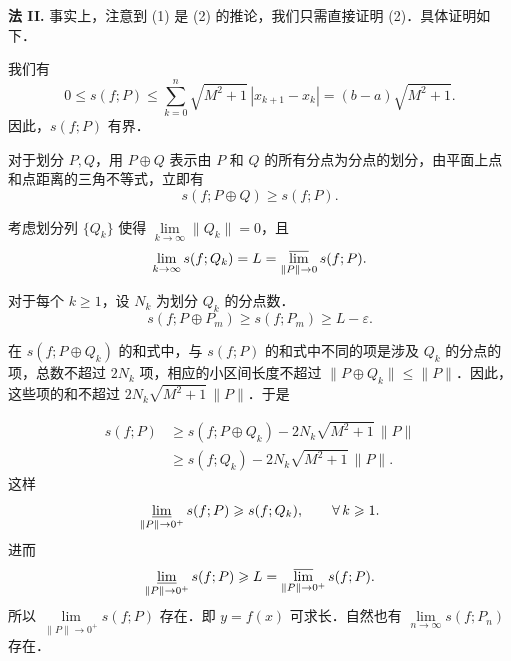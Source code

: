 \begin{solution}
\textbf{法 II.} 事实上，注意到 (1) 是 (2) 的推论，我们只需直接证明 (2)．具体证明如下．

我们有
\[
  0\leqslant s(f;P)\leqslant\sum_{k=0}^{n}\sqrt{M^2+1}\,|x_{k+1}-x_k|=(b-a)\sqrt{M^2+1}.
\]
因此，$s(f;P)$ 有界．

对于划分 $P,Q$，用 $P\oplus Q$ 表示由 $P$ 和 $Q$ 的所有分点为分点的划分，由平面上点和点距离的三角不等式，立即有
\[
  s(f;P\oplus Q)\geqslant s(f;P).
\]

考虑划分列 $\{Q_k\}$ 使得 $\lim\limits_{k\to\infty}\|Q_k\|=0$，且
\[
  \lim_{k\to\infty}s(f;Q_k)=L=\varlimsup_{\|P\|\to 0}s(f;P).
\]

对于每个 $k\geqslant 1$，设 $N_k$ 为划分 $Q_k$ 的分点数．
\[
  s(f;P\oplus P_m)\geqslant s(f;P_m)\geqslant L-\varepsilon.
\]
{\setlength{\emergencystretch}{1em}%
在 $s(f;P\oplus Q_k)$ 的和式中，与 $s(f;P)$ 的和式中不同的项是涉及 $Q_k$ 的分点的项，总数不超过 $2N_k$ 项，相应的小区间长度不超过 $\|P\oplus Q_k\|\leqslant\|P\|$．因此，这些项的和不超过 $2N_k\sqrt{M^2+1}\,\|P\|$．于是\par}
\begin{align*}
s(f;P)&\geqslant s(f;P\oplus Q_k)-2N_k\sqrt{M^2+1}\,\|P\|\\
&\geqslant s(f;Q_k)-2N_k\sqrt{M^2+1}\,\|P\|.
\end{align*}
这样
\[
  \varliminf_{\|P\|\to 0^+}s(f;P)\geqslant s(f;Q_k),\qquad \forall\, k\geqslant 1.
\]
进而
\[
  \varliminf_{\|P\|\to 0^+}s(f;P)\geqslant L=\varlimsup_{\|P\|\to 0^+}s(f;P).
\]
所以 $\lim\limits_{\|P\|\to 0^+}s(f;P)$ 存在．即 $y=f(x)$ 可求长．自然也有 $\lim\limits_{n\to\infty}s(f;P_n)$ 存在．
\end{solution}
